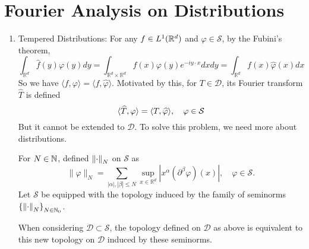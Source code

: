 \section{Fourier Analysis on Distributions}
\begin{enumerate}
	\item Tempered Distributions: For any $f \in L^1(\mathbb{R}^d)$ and $\varphi \in \mathcal{S}$, by the Fubini's theorem,
	\begin{equation*}
		\int_{\mathbb{R}^d} \widehat{f}(y) \varphi(y) d y=\int_{\mathbb{R}^d \times \mathbb{R}^d} f(x) \varphi(y) e^{-i y \cdot x} d x d y=\int_{\mathbb{R}^d} f(x) \widehat{\varphi}(x) d x
	\end{equation*}
	So we have $\langle\widehat{f}, \varphi\rangle=\langle f, \widehat{\varphi}\rangle$. Motivated by this, for $T \in \mathcal{D}$, its Fourier transform $\widehat{T}$ is defined
	\begin{equation*}
		\langle \widehat{T},\varphi \rangle = \langle T,\widehat{\varphi} \rangle,\quad \varphi \in \mathcal{S}
	\end{equation*}
	But it cannot be extended to $\mathcal{D}$. To solve this problem, we need more about distributions. 

	\noindent For $N \in \mathbb{N}$, defined $\left\lVert\cdot\right\lVert_N$ on $\mathcal{S}$ as
	\begin{equation*}
		\|\varphi\|_N=\sum_{|\alpha|,|\beta| \leq N} \sup _{x \in \mathbb{R}^d}\left|x^\alpha\left(\partial^\beta \varphi\right)(x)\right|, \quad \varphi \in \mathcal{S} .
	\end{equation*}
	Let $\mathcal{S}$ be equipped with the topology induced by the family of seminorms $\left\{\left\lVert\cdot\right\lVert_N\right\}_{N \in \mathbb{N}_0}$.
	\begin{rmk}
		When considering $\mathcal{D} \subset \mathcal{S}$, the topology defined on $\mathcal{D}$ as above is equivalent to this new topology on $\mathcal{D}$ induced by these seminorms.
	\end{rmk}


\end{enumerate}
